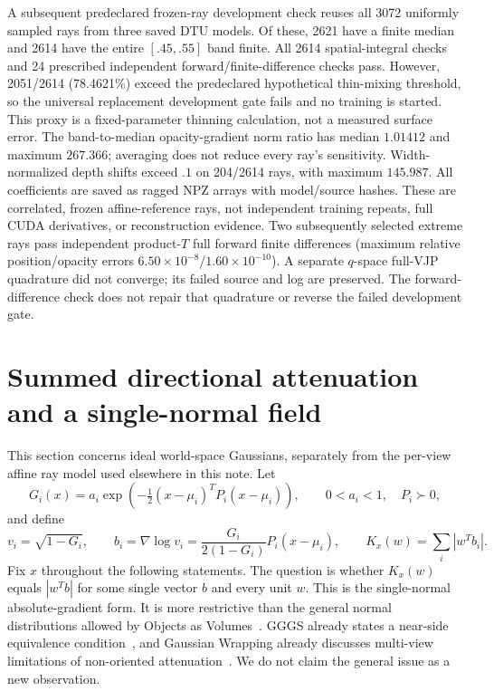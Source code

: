 \documentclass[11pt,a4paper]{article}
\begin{document}
A subsequent predeclared frozen-ray development check reuses all 3072
uniformly sampled rays from three saved DTU models. Of these, 2621 have
a finite median and 2614 have the entire $[.45,.55]$ band finite.
All 2614 spatial-integral checks and 24 prescribed independent
forward/finite-difference checks pass. However, 2051/2614 (78.4621\%)
exceed the predeclared hypothetical thin-mixing threshold, so the
universal replacement development gate fails and no training is started.
This proxy is a fixed-parameter thinning calculation, not a measured
surface error. The band-to-median opacity-gradient norm ratio has
median $1.01412$ and maximum $267.366$; averaging does not reduce every
ray's sensitivity. Width-normalized depth shifts exceed $.1$ on
204/2614 rays, with maximum $145.987$.
All coefficients are saved as ragged NPZ arrays with model/source hashes.
These are correlated, frozen affine-reference rays, not independent
training repeats, full CUDA derivatives, or reconstruction evidence.
Two subsequently selected extreme rays pass independent product-$T$
full forward finite differences (maximum relative position/opacity
errors $6.50\times10^{-8}$/$1.60\times10^{-10}$).
A separate $q$-space full-VJP quadrature did not converge; its failed
source and log are preserved. The forward-difference check does not
repair that quadrature or reverse the failed development gate.

\section{Summed directional attenuation and a single-normal field}

This section concerns ideal world-space Gaussians, separately from the
per-view affine ray model used elsewhere in this note. Let
\[
 G_i(x)=a_i\exp\!\left(-\tfrac12(x-\mu_i)^TP_i(x-\mu_i)\right),
 \qquad 0<a_i<1,\quad P_i\succ0,
\]
and define
\begin{equation}\label{eq:directional-world}
 v_i=\sqrt{1-G_i},\qquad
 b_i=\nabla\log v_i=\frac{G_i}{2(1-G_i)}P_i(x-\mu_i),\qquad
 K_x(w)=\sum_i|w^Tb_i|.
\end{equation}
Fix $x$ throughout the following statements. The question is whether
$K_x(w)$ equals $|w^Tb|$ for some single vector $b$ and every unit $w$.
This is the single-normal absolute-gradient form. It is more restrictive
than the general normal distributions allowed by Objects as
Volumes~\cite{oav}. GGGS already states a near-side equivalence
condition~\cite{gggs}, and Gaussian Wrapping already discusses
multi-view limitations of non-oriented attenuation~\cite{wrapping}.
We do not claim the general issue as a new observation.
\end{document}
